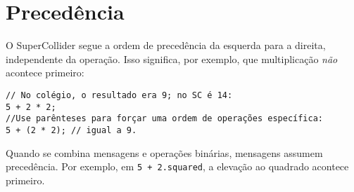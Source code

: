 \section{Precedência}

O SuperCollider segue a ordem de precedência da esquerda para a direita, independente da operação. Isso significa, por exemplo, que multiplicação \emph{não} acontece primeiro:

\begin{lstlisting}[style=SuperCollider-IDE, basicstyle=\scttfamily\footnotesize]
// No colégio, o resultado era 9; no SC é 14:
5 + 2 * 2; 
//Use parênteses para forçar uma ordem de operações específica:
5 + (2 * 2); // igual a 9.
\end{lstlisting}

Quando se combina mensagens e operações binárias, mensagens assumem precedência. Por exemplo, em \texttt{5 + 2.squared}, a elevação ao quadrado acontece primeiro.
